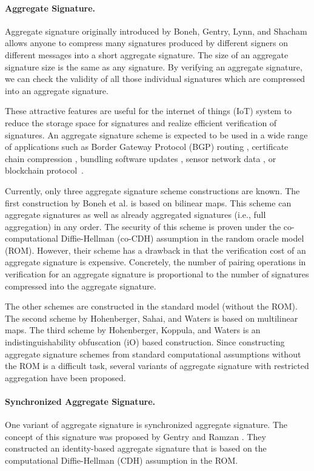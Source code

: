 \documentclass[a4paper,11pt]{fullverllncs}
\begin{document}
\paragraph{\bf Aggregate Signature.}

Aggregate signature originally introduced by Boneh, Gentry, Lynn, and Shacham \cite{BGLS03} allows anyone to compress many signatures produced by different signers on different messages into a short aggregate signature.
The size of an aggregate signature size is the same as any signature.
By verifying an aggregate signature, we can check the validity of all those individual signatures which are compressed into an aggregate signature.

These attractive features are useful for the internet of things (IoT) system to reduce the storage space for signatures and realize efficient verification of signatures.
An aggregate signature scheme is expected to be used in a wide range of applications such as Border Gateway Protocol (BGP) routing \cite{BGOY07}, certificate chain compression \cite{BGLS03}, bundling software updates \cite{AGH10}, sensor network data \cite{AGH10}, or blockchain protocol~\cite{HW18}.

Currently, only three aggregate signature scheme constructions are known.
The first construction by Boneh et al. \cite{BGLS03} is based on bilinear maps.
This scheme can aggregate signatures as well as already aggregated signatures (i.e., full aggregation) in any order.
The security of this scheme is proven under the co-computational Diffie-Hellman (co-CDH) assumption in the random oracle model (ROM).
However, their scheme has a drawback in that the verification cost of an aggregate signature is expensive.
Concretely, the number of pairing operations in verification for an aggregate signature is proportional to the number of signatures compressed into the aggregate signature.

The other schemes are constructed in the standard model (without the ROM).
The second scheme by Hohenberger, Sahai, and Waters \cite{HSW13} is based on multilinear maps.
The third scheme by Hohenberger, Koppula, and Waters \cite{HKW15} is an indistinguishability obfuscation (iO) based construction.
Since constructing aggregate signature schemes from standard computational assumptions without the ROM is a difficult task, several variants of aggregate signature with restricted aggregation have been proposed.


\paragraph{\bf Synchronized Aggregate Signature.}
One variant of aggregate signature is synchronized aggregate signature.
The concept of this signature was proposed by Gentry and Ramzan \cite{GR06}.
They constructed an identity-based aggregate signature that is based on the computational Diffie-Hellman (CDH) assumption in the ROM.
\end{document}
